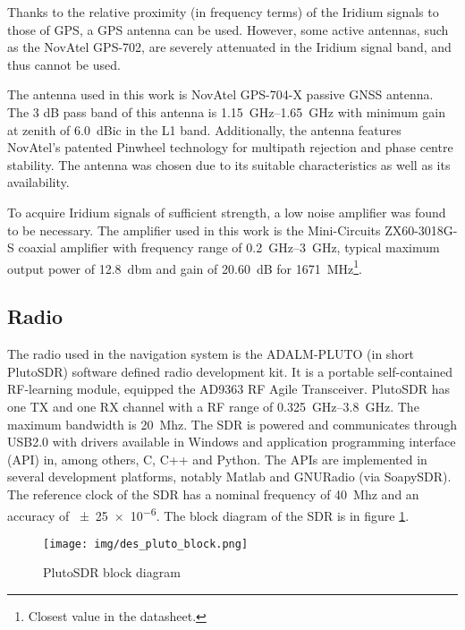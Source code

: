 Thanks to the relative proximity (in frequency terms) of the Iridium signals to those of GPS, a GPS antenna can be used. However, some active antennas, such as the NovAtel GPS-702\cite{des03}, are severely attenuated in the Iridium signal band, and thus cannot be used.

The antenna used in this work is NovAtel GPS-704-X passive GNSS antenna. 
The 3 dB pass band of this antenna is \qtyrange{1.15}{1.65}{GHz} with minimum gain at zenith of \qty{+6.0}{dBic} in the L1 band. Additionally, the antenna features NovAtel’s patented Pinwheel technology for multipath rejection and phase centre stability\cite{des04}. The antenna was chosen due to its suitable characteristics as well as its availability.

To acquire Iridium signals of sufficient strength, a low noise amplifier was found to be necessary. The amplifier used in this work is the Mini-Circuits ZX60-3018G-S coaxial amplifier with frequency range of \qtyrange{0.2}{3}{GHz}, typical maximum output power of \qty{+12.8}{dbm} and gain of \qty{20.60}{dB} for \qty{1671}{MHz}\footnote{Closest value in the datasheet.}\cite{des06}.

\subsection{Radio}
The radio used in the navigation system is the ADALM-PLUTO (in short PlutoSDR) software defined radio development kit. It is a portable self-contained RF-learning module, equipped the AD9363 RF Agile Transceiver. PlutoSDR has one TX and one RX channel with a RF range of \qtyrange{0.325}{3.8}{GHz}. The maximum bandwidth is \qty{20}{Mhz}. The SDR is powered and communicates through USB2.0 with drivers available in Windows and application programming interface (API) in, among others, C, C++ and Python. The APIs are implemented in several development platforms, notably Matlab and GNURadio (via SoapySDR). The reference clock of the SDR has a nominal frequency of \qty{40}{Mhz} and an accuracy of \num{\pm25e-6}\cite{des05}. The block diagram of the SDR is in figure \ref{f_des_pluto_block}.

\begin{figure}
    \centering
    \texttt{[image: img/des\_pluto\_block.png]}
    \caption{PlutoSDR block diagram\cite{des05}}
    \label{f_des_pluto_block}
\end{figure}

